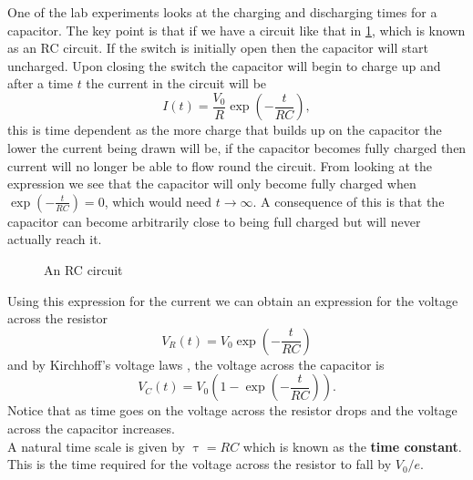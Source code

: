One of the lab experiments looks at the charging and discharging times for a capacitor. The key point is that if we have a circuit like that in \cref{fig: RC circuit}, which is known as an RC circuit. If the switch is initially open then the capacitor will start uncharged. Upon closing the switch the capacitor will begin to charge up and after a time $t$ the current in the circuit will be
\begin{equation*}
I(t)=\frac{V_{0}}{R}\exp\left(-\frac{t}{RC}\right),
\end{equation*}
this is time dependent as the more charge that builds up on the capacitor the lower the current being drawn will be, if the capacitor becomes fully charged then current will no longer be able to flow round the circuit. From looking at the expression we see that the capacitor will only become fully charged when $\exp\left(-\frac{t}{RC}\right)=0$, which would need $t\to \infty$. A consequence of this is that the capacitor can become arbitrarily close to being full charged but will never actually reach it.\\

     \begin{figure}[ht]
    \centering
    \caption{An RC circuit}
    \label{fig: RC circuit}
\end{figure}
Using this expression for the current we can obtain an expression for the voltage across the resistor
\begin{equation*}
V_{R}(t)=V_{0}\exp\left(-\frac{t}{RC}\right)
\end{equation*}
and by Kirchhoff's voltage laws , the voltage across the capacitor is
\begin{equation*}
V_{C}(t)=V_{0}\left(1-\exp\left(-\frac{t}{RC}\right)\right).
\end{equation*}
Notice that as time goes on the voltage across the resistor drops and the voltage across the capacitor increases.\\
 
A natural time scale is given by $\uptau=RC$ which is known as the \textbf{time constant}. This is the time required for the voltage across the resistor to fall by $V_{0}/e$.\\

